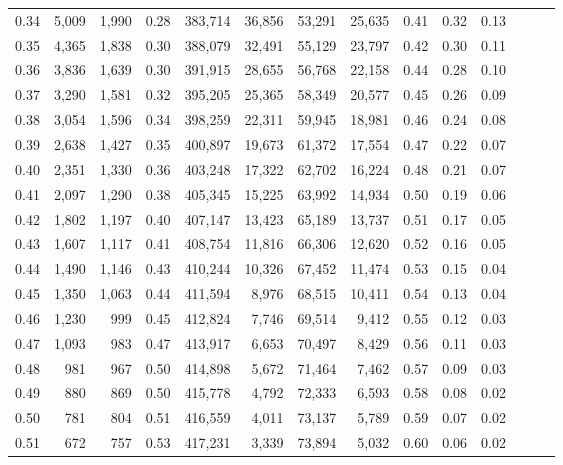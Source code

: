 \begin{tabular}{rrrrrrrrrrrrrr}
0.34 &   5,009 &  1,990 &  0.28 &  383,714 &   36,856 &  53,291 &  25,635 &  0.41 &  0.32 &      0.13 \\
0.35 &   4,365 &  1,838 &  0.30 &  388,079 &   32,491 &  55,129 &  23,797 &  0.42 &  0.30 &      0.11 \\
0.36 &   3,836 &  1,639 &  0.30 &  391,915 &   28,655 &  56,768 &  22,158 &  0.44 &  0.28 &      0.10 \\
0.37 &   3,290 &  1,581 &  0.32 &  395,205 &   25,365 &  58,349 &  20,577 &  0.45 &  0.26 &      0.09 \\
0.38 &   3,054 &  1,596 &  0.34 &  398,259 &   22,311 &  59,945 &  18,981 &  0.46 &  0.24 &      0.08 \\
0.39 &   2,638 &  1,427 &  0.35 &  400,897 &   19,673 &  61,372 &  17,554 &  0.47 &  0.22 &      0.07 \\
0.40 &   2,351 &  1,330 &  0.36 &  403,248 &   17,322 &  62,702 &  16,224 &  0.48 &  0.21 &      0.07 \\
0.41 &   2,097 &  1,290 &  0.38 &  405,345 &   15,225 &  63,992 &  14,934 &  0.50 &  0.19 &      0.06 \\
0.42 &   1,802 &  1,197 &  0.40 &  407,147 &   13,423 &  65,189 &  13,737 &  0.51 &  0.17 &      0.05 \\
0.43 &   1,607 &  1,117 &  0.41 &  408,754 &   11,816 &  66,306 &  12,620 &  0.52 &  0.16 &      0.05 \\
0.44 &   1,490 &  1,146 &  0.43 &  410,244 &   10,326 &  67,452 &  11,474 &  0.53 &  0.15 &      0.04 \\
0.45 &   1,350 &  1,063 &  0.44 &  411,594 &    8,976 &  68,515 &  10,411 &  0.54 &  0.13 &      0.04 \\
0.46 &   1,230 &    999 &  0.45 &  412,824 &    7,746 &  69,514 &   9,412 &  0.55 &  0.12 &      0.03 \\
0.47 &   1,093 &    983 &  0.47 &  413,917 &    6,653 &  70,497 &   8,429 &  0.56 &  0.11 &      0.03 \\
0.48 &     981 &    967 &  0.50 &  414,898 &    5,672 &  71,464 &   7,462 &  0.57 &  0.09 &      0.03 \\
0.49 &     880 &    869 &  0.50 &  415,778 &    4,792 &  72,333 &   6,593 &  0.58 &  0.08 &      0.02 \\
0.50 &     781 &    804 &  0.51 &  416,559 &    4,011 &  73,137 &   5,789 &  0.59 &  0.07 &      0.02 \\
0.51 &     672 &    757 &  0.53 &  417,231 &    3,339 &  73,894 &   5,032 &  0.60 &  0.06 &      0.02 \\

\end{tabular}

